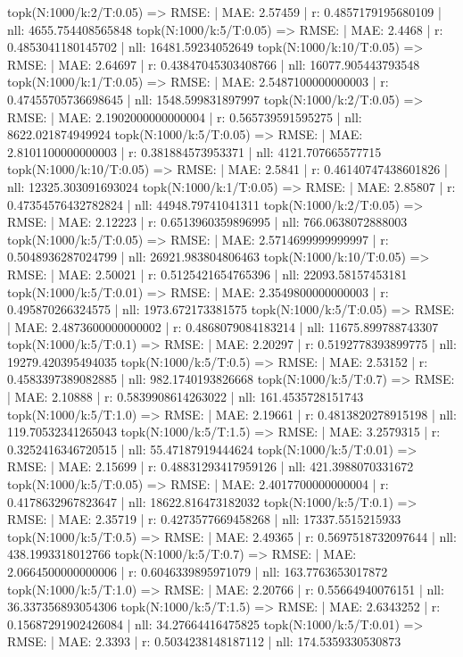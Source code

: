 topk(N:1000/k:2/T:0.05) => RMSE: | MAE: 2.57459 | r: 0.4857179195680109 | nll: 4655.754408565848
topk(N:1000/k:5/T:0.05) => RMSE: | MAE: 2.4468 | r: 0.4853041180145702 | nll: 16481.59234052649
topk(N:1000/k:10/T:0.05) => RMSE: | MAE: 2.64697 | r: 0.43847045303408766 | nll: 16077.905443793548
topk(N:1000/k:1/T:0.05) => RMSE: | MAE: 2.5487100000000003 | r: 0.47455705736698645 | nll: 1548.599831897997
topk(N:1000/k:2/T:0.05) => RMSE: | MAE: 2.1902000000000004 | r: 0.565739591595275 | nll: 8622.021874949924
topk(N:1000/k:5/T:0.05) => RMSE: | MAE: 2.8101100000000003 | r: 0.381884573953371 | nll: 4121.707665577715
topk(N:1000/k:10/T:0.05) => RMSE: | MAE: 2.5841 | r: 0.46140747438601826 | nll: 12325.303091693024
topk(N:1000/k:1/T:0.05) => RMSE: | MAE: 2.85807 | r: 0.47354576432782824 | nll: 44948.79741041311
topk(N:1000/k:2/T:0.05) => RMSE: | MAE: 2.12223 | r: 0.6513960359896995 | nll: 766.0638072888003
topk(N:1000/k:5/T:0.05) => RMSE: | MAE: 2.5714699999999997 | r: 0.5048936287024799 | nll: 26921.983804806463
topk(N:1000/k:10/T:0.05) => RMSE: | MAE: 2.50021 | r: 0.5125421654765396 | nll: 22093.58157453181
topk(N:1000/k:5/T:0.01) => RMSE: | MAE: 2.3549800000000003 | r: 0.495870266324575 | nll: 1973.672173381575
topk(N:1000/k:5/T:0.05) => RMSE: | MAE: 2.4873600000000002 | r: 0.4868079084183214 | nll: 11675.899788743307
topk(N:1000/k:5/T:0.1) => RMSE: | MAE: 2.20297 | r: 0.5192778393899775 | nll: 19279.420395494035
topk(N:1000/k:5/T:0.5) => RMSE: | MAE: 2.53152 | r: 0.4583397389082885 | nll: 982.1740193826668
topk(N:1000/k:5/T:0.7) => RMSE: | MAE: 2.10888 | r: 0.5839908614263022 | nll: 161.4535728151743
topk(N:1000/k:5/T:1.0) => RMSE: | MAE: 2.19661 | r: 0.4813820278915198 | nll: 119.70532341265043
topk(N:1000/k:5/T:1.5) => RMSE: | MAE: 3.2579315 | r: 0.3252416346720515 | nll: 55.47187919444624
topk(N:1000/k:5/T:0.01) => RMSE: | MAE: 2.15699 | r: 0.48831293417959126 | nll: 421.3988070331672
topk(N:1000/k:5/T:0.05) => RMSE: | MAE: 2.4017700000000004 | r: 0.4178632967823647 | nll: 18622.816473182032
topk(N:1000/k:5/T:0.1) => RMSE: | MAE: 2.35719 | r: 0.4273577669458268 | nll: 17337.5515215933
topk(N:1000/k:5/T:0.5) => RMSE: | MAE: 2.49365 | r: 0.5697518732097644 | nll: 438.1993318012766
topk(N:1000/k:5/T:0.7) => RMSE: | MAE: 2.0664500000000006 | r: 0.6046339895971079 | nll: 163.7763653017872
topk(N:1000/k:5/T:1.0) => RMSE: | MAE: 2.20766 | r: 0.55664940076151 | nll: 36.337356893054306
topk(N:1000/k:5/T:1.5) => RMSE: | MAE: 2.6343252 | r: 0.15687291902426084 | nll: 34.27664416475825
topk(N:1000/k:5/T:0.01) => RMSE: | MAE: 2.3393 | r: 0.5034238148187112 | nll: 174.5359330530873
